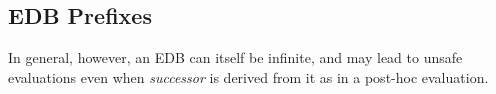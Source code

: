 











\subsection{EDB Prefixes}

In general, however, an EDB can itself be infinite, and may lead to unsafe evaluations even when \emph{successor} is derived from it
as in a post-hoc evaluation.

